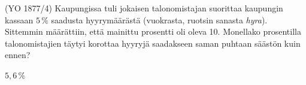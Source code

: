 \begin{tehtavasivu}
\begin{tehtava}
    (YO 1877/4) Kaupungissa tuli jokaisen talonomistajan suorittaa kaupungin kassaan $5\,\%$ saadusta
    hyyrymäärästä (vuokrasta, ruotsin sanasta \textit{hyra}). Sittemmin määrättiin, että mainittu
    prosentti oli oleva 10. Monellako prosentilla talonomistajien täytyi korottaa hyyryjä
    saadakseen saman puhtaan säästön kuin ennen?
    \begin{vastaus}
        $5,6\,\%$
    \end{vastaus}
\end{tehtava}


\end{tehtavasivu}
